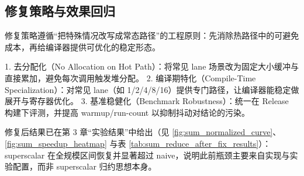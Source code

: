 \subsection{修复策略与效果回归}
修复策略遵循“把特殊情况改写成常态路径”的工程原则：先消除热路径中的可避免成本，再给编译器提供可优化的稳定形态。

1. 去分配化（No Allocation on Hot Path）：将常见 lane 场景改为固定大小缓冲与直接累加，避免每次调用触发堆分配。
2. 编译期特化（Compile-Time Specialization）：对常见 lane（如 1/2/4/8/16）提供专门路径，让编译器能稳定做展开与寄存器优化。
3. 基准稳健化（Benchmark Robustness）：统一在 Release 构建下评测，并提高 warmup/run-count 以抑制抖动对结论的污染。

修复后结果已在第 3 章“实验结果”中给出（见 \ref{fig:sum_normalized_curve}、\ref{fig:sum_speedup_heatmap} 与表 \ref{tab:sum_reduce_after_fix_results}）：superscalar 在全规模区间恢复并显著超过 naive，说明此前瓶颈主要来自实现与实验配置，而非 superscalar 归约思想本身。


